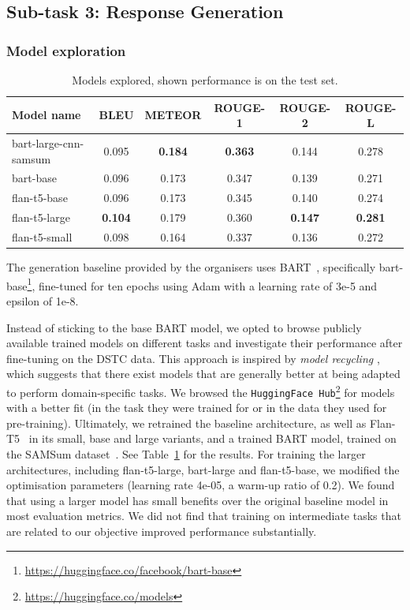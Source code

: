 \documentclass[11pt]{article}
\begin{document}
\subsection{Sub-task 3: Response Generation}
\subsubsection{Model exploration}
\label{sec:model_exploration}

\begin{table}[!h]
    \centering
    \begin{tabular}{@{}lccccc@{}}
    \toprule
        \textbf{Model name} & \textbf{BLEU} & \textbf{METEOR} & \textbf{ROUGE-1} & \textbf{ROUGE-2} & \textbf{ROUGE-L} \\
    \midrule
        bart-large-cnn-samsum   & 0.095 & \textbf{0.184} & \textbf{0.363} & 0.144 & 0.278 \\
        bart-base               & 0.096 & 0.173 & 0.347 & 0.139 & 0.271 \\
        flan-t5-base            & 0.096 & 0.173 & 0.345 & 0.140 & 0.274 \\
        flan-t5-large           & \textbf{0.104} & 0.179 & 0.360 & \textbf{0.147} & \textbf{0.281} \\
        flan-t5-small           & 0.098 & 0.164 & 0.337 & 0.136 & 0.272 \\
    \bottomrule
    \end{tabular}
    \caption{Models explored, shown performance is on the test set. }
    \label{tab:models}
\end{table}

The generation baseline provided by the organisers uses BART~\cite{lewis-etal-2020-bart}, specifically bart-base\footnote{\url{https://huggingface.co/facebook/bart-base}}, fine-tuned for ten epochs using Adam with a learning rate of 3e-5 and epsilon of 1e-8.

Instead of sticking to the base BART model, we opted to browse publicly available trained models on different tasks and investigate their performance after fine-tuning on the DSTC data. This approach is inspired by \emph{model recycling} \citep{choshen2022start}, which suggests that there exist models that are generally better at being adapted to perform domain-specific tasks.
We browsed the \texttt{HuggingFace Hub}\footnote{\url{https://huggingface.co/models}} for models with a better fit (in the task they were trained for or in the data they used for pre-training). Ultimately, we retrained the baseline architecture, as well as Flan-T5~\cite{chung2022scaling} in its small, base and large variants, and a trained BART model, trained on the SAMSum dataset~\cite{gliwa2019samsum}. See Table~\ref{tab:models} for the results. For training the larger architectures, including flan-t5-large, bart-large and flan-t5-base, we modified the optimisation parameters (learning rate 4e-05, a warm-up ratio of 0.2). We found that using a larger model has small benefits over the original baseline model in most evaluation metrics. We did not find that training on intermediate tasks that are related to our objective improved performance substantially.
\end{document}
